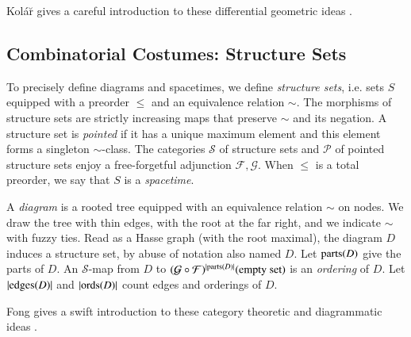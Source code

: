 \documentclass{article}
\newcommand{\Free}{\mathcal{F}}
\newcommand{\Forg}{\mathcal{G}}
\newcommand{\edges}{\text{\textnormal{edges}}}
\newcommand{\ords}{\text{\textnormal{ords}}}
\newcommand{\parts}{\text{\textnormal{parts}}}
\newcommand{\Pp}{\mathcal{P}}
\newcommand{\Ss}{\mathcal{S}}
\begin{document}
        Kol\'{a}\u{r} gives a careful introduction to these differential
        geometric ideas .

    
    \subsection{Combinatorial Costumes: Structure Sets}
        To precisely define diagrams and spacetimes, we define \emph{structure
        sets}, i.e. sets $S$ equipped with a preorder $\leq$ and an equivalence
        relation $\sim$.  The morphisms of structure sets are strictly
        increasing maps that preserve $\sim$ and its negation.  A structure set
        is \emph{pointed} if it has a unique maximum element and this element
        forms a singleton $\sim$-class.  The categories $\Ss$ of structure sets
        and $\Pp$ of pointed structure sets enjoy a free-forgetful adjunction
        $\Free, \Forg$.  When $\leq$ is a total preorder, we say that $S$ is a
        \emph{spacetime}.
    
        A \emph{diagram} is a rooted tree equipped with an equivalence relation
        $\sim$ on nodes.  We draw the tree with thin edges, with the root at
        the far right, and we indicate $\sim$ with fuzzy ties.  Read as a Hasse
        graph (with the root maximal), the diagram $D$ induces a structure set,
        by abuse of notation also named $D$.  Let $\parts(D)$ give the parts of
        $D$.  An $\Ss$-map from $D$ to
        $
            (\Forg\circ\Free)^{|\parts(D)|}(\text{empty set})
        $
        is an \emph{ordering} of $D$.  Let $|\edges(D)|$ and $|\ords(D)|$ count
        edges and orderings of $D$.
    
        Fong gives a swift introduction to these category theoretic and
        diagrammatic ideas .
            
\end{document}

